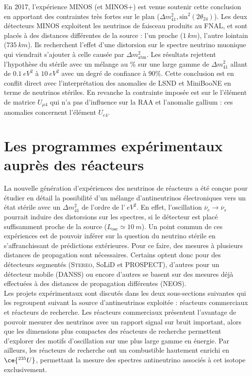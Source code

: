En 2017, l'expérience MINOS (et MINOS+) est venue soutenir cette conclusion en apportant des contraintes très fortes sur le plan ($\Delta m^2_{41}, \textrm{sin}^2(2\theta_{24})$)\cite{Adamson:2017uda}. Les deux détecteurs MINOS exploitent les neutrinos de faisceau produits au FNAL, et sont placés à des distances différentes de la source : l'un proche ($\SI{1}{km}$), l'autre lointain ($\SI{735}{km}$). Ils recherchent l'effet d'une distorsion sur le spectre neutrino muonique qui viendrait s'ajouter à celle causée par $\Delta m^2_\textrm{atm}$. Les résultats rejettent l'hypothèse du stérile avec un mélange au \% sur une large gamme de $\Delta m^2_{41}$ allant de $\SI{0.1}{eV^2}$ à $\SI{10}{eV^2}$ avec un degré de confiance à 90\%. Cette conclusion est en conflit direct avec l'interprétation des anomalies de LSND et MiniBooNE en terme de neutrinos stériles. En revanche la contrainte imposée est sur le l'élément de matrice $U_{\mu4}$ qui n'a pas d'influence sur la RAA et l'anomalie gallium : ces anomalies concernent l'élément $U_{e4}$.

\bigbreak

\section{Les programmes expérimentaux auprès des réacteurs}

La nouvelle génération d'expériences des neutrinos de réacteurs a été conçue pour étudier en détail la possibilité d'un mélange d'antineutrinos électroniques vers un état stérile avec un $\Delta m^2_{41}$ de l'ordre de l'$\SI{}{eV^2}$. En effet, l'oscillation $\overline{\nu}_e \rightarrow \overline{\nu}_s$ pourrait induire des distorsions sur les spectres, si le détecteur est placé suffisamment proche de la source ($L_\textrm{osc} \simeq \SI{10}{m}$). Un point commun de ces expériences est de pouvoir inférer sur la question du neutrino stérile en s'affranchissant de prédictions extérieures. Pour ce faire, des mesures à plusieurs distances de propagation sont nécessaires. Certains optent donc pour des détecteurs segmentés (\textsc{Stereo}, SoLiD et PROSPECT), d'autres pour un détecteur mobile (DANSS) ou encore d'autres se basent sur des mesures déjà effectuées à des distances de propagation différentes (NEOS).\\

Les projets expérimentaux sont discutés dans les deux sous-sections suivantes qui les regroupent suivant la source d'antineutrinos exploitée : réacteurs commerciaux et réacteurs de recherche. Les réacteurs commerciaux présentent l'avantage de pouvoir mesurer des neutrinos avec un rapport signal sur bruit important, alors que les dimensions plus compactes des réacteurs de recherche permettent d'explorer des motifs d'oscillation sur une plus large gamme en énergie. Par ailleurs, les réacteurs de recherche ont un combustible hautement enrichi en $\ce{^{235}U}$, permettant la mesure des spectres antineutrino associés à cet isotope exclusivement.

